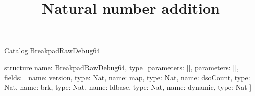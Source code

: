 \begin{lexlean}{Catalog.BreakpadRawDebug64}
\title{Natural number addition}
\begin{semanticmodule}
structure{
  name: BreakpadRawDebug64,
  type_parameters: [],
  parameters: [],
  fields: [
    {name: version, type: Nat},
    {name: map, type: Nat},
    {name: dsoCount, type: Nat},
    {name: brk, type: Nat},
    {name: ldbase, type: Nat},
    {name: dynamic, type: Nat}
  ]
}
\end{semanticmodule}
\end{lexlean}
